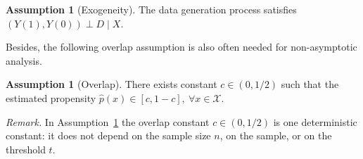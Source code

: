 \documentclass[12pt]{article}
\theoremstyle{plain}
\theoremstyle{definition}
\newtheorem{assumption}[theorem]{Assumption}
\begin{document}
\begin{assumption} [Exogeneity] \label{assump:exo}
  \label{assump:unconfouding}The data generation process satisfies $(Y (1), Y(0)) \perp D \mid X$. 
\end{assumption}

Besides, the following overlap assumption is
also often needed for non-asymptotic analysis.
\begin{assumption}
  [Overlap]\label{assump:overlap}There exists constant $c \in (0,1/2)$ such that the estimated propensity $\hat{p} (x) \in [c, 1 - c], \  \forall x \in \mathcal{X}$.
\end{assumption}

\noindent\textit{Remark.} In Assumption~\ref{assump:overlap} the overlap constant $c\in(0,1/2)$ is one deterministic constant: it does not depend on the sample size $n$, on the sample, or on the threshold $t$.
\end{document}
